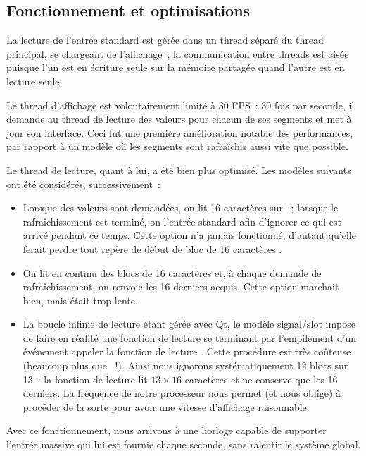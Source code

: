\documentclass[11pt,a4paper]{article}
\begin{document}
\subsection{Fonctionnement et optimisations}

La lecture de l'entrée standard est gérée dans un thread séparé du thread principal, se chargeant de l'affichage~; la communication entre threads est aisée puisque l'un est en écriture seule sur la mémoire partagée quand l'autre est en lecture seule.

Le thread d'affichage est volontairement limité à 30 FPS~: 30 fois par seconde, il demande au thread de lecture des valeurs pour chacun de ses segments et met à jour son interface. Ceci fut une première amélioration notable des performances, par rapport à un modèle où les segments sont rafraîchis aussi vite que possible.

Le thread de lecture, quant à lui, a été bien plus optimisé. Les modèles suivants ont été considérés, successivement~:
\begin{itemize}
\item Lorsque des valeurs sont demandées, on lit 16 caractères sur ~; lorsque le rafraîchissement est terminé, on  l'entrée standard afin d'ignorer ce qui est arrivé pendant ce temps. Cette option n'a jamais fonctionné, d'autant qu'elle ferait perdre tout repère de \og début de bloc de 16 caractères \fg{}.

\item On lit en continu des blocs de 16 caractères et, à chaque demande de rafraîchissement, on renvoie les 16 derniers acquis. Cette option marchait bien, mais était trop lente.

\item La \og boucle infinie \fg{} de lecture étant gérée avec Qt, le modèle signal/slot impose de faire en réalité une fonction de lecture se terminant par l'empilement d'un événement \og appeler la fonction de lecture \fg{}. Cette procédure est très coûteuse (beaucoup plus que ~!). Ainsi nous ignorons systématiquement 12 blocs sur 13~: la fonction de lecture lit $13 \times 16$ caractères et ne conserve que les 16 derniers. La fréquence de notre processeur nous permet (et nous oblige) à procéder de la sorte pour avoir une vitesse d'affichage raisonnable.
\end{itemize}

Avec ce fonctionnement, nous arrivons à une horloge capable de supporter l'entrée massive qui lui est fournie chaque seconde, sans ralentir le système global.
\end{document}

